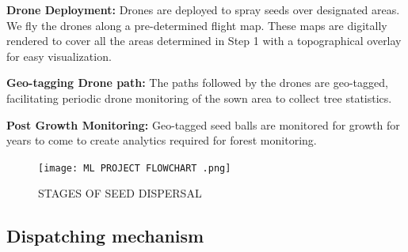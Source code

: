 \documentclass[pmlr,twocolumn,10pt]{jmlr}
\begin{document}
\textbf{Drone Deployment:} Drones are deployed to spray seeds over designated areas. We fly the drones along a pre-determined flight map. These maps are digitally rendered to cover all the areas determined in Step 1 with a topographical overlay for easy visualization.

\textbf{Geo-tagging Drone path:} The paths followed by the drones are geo-tagged, facilitating periodic drone monitoring of the sown area to collect tree statistics.

\textbf{Post Growth Monitoring:} Geo-tagged seed balls are monitored for growth for years to come to create analytics required for forest monitoring.

\begin{figure}[htp]
    \centering
    \texttt{[image: ML PROJECT FLOWCHART .png]}
    \caption{STAGES OF SEED DISPERSAL}
    \label{fig:galaxy}
\end{figure}

\subsection{Dispatching mechanism}
\end{document}
